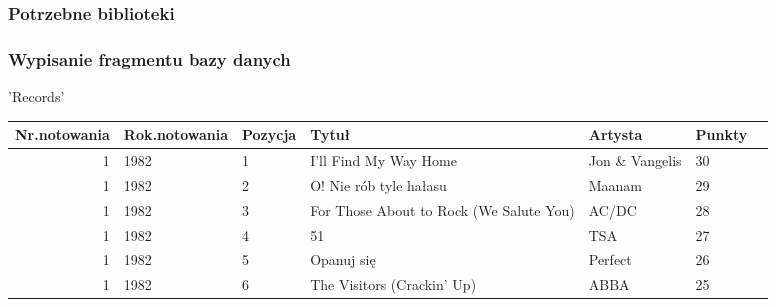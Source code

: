 \documentclass[11pt]{article}
\begin{document}
    \hypertarget{potrzebne-biblioteki}{%
\subsubsection{Potrzebne biblioteki}\label{potrzebne-biblioteki}}

    \hypertarget{wypisanie-fragmentu-bazy-danych}{%
\subsubsection{Wypisanie fragmentu bazy
danych}\label{wypisanie-fragmentu-bazy-danych}}

    'Records'

    
    \begin{tabular}{r|llllll}
 Nr.notowania & Rok.notowania & Pozycja & Tytuł & Artysta & Punkty\\
\hline
	 1                                       & 1982                                    &  1                                      & I'll Find My Way Home                   & Jon \& Vangelis                        & 30                                     \\
	 1                                       & 1982                                    &  2                                      & O! Nie rób tyle hałasu                  & Maanam                                  & 29                                     \\
	 1                                       & 1982                                    &  3                                      & For Those About to Rock (We Salute You) & AC/DC                                   & 28                                     \\
	 1                                       & 1982                                    &  4                                      & 51                                      & TSA                                     & 27                                     \\
	 1                                       & 1982                                    &  5                                      & Opanuj się                              & Perfect                                 & 26                                     \\
	 1                                       & 1982                                    &  6                                      & The Visitors (Crackin' Up)              & ABBA                                    & 25                                     \\

\end{tabular}
\end{document}
